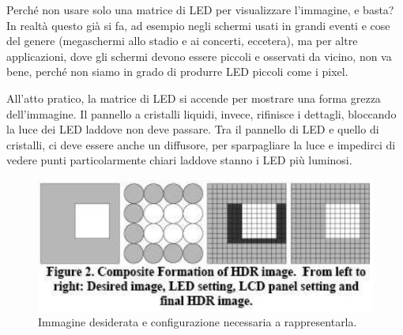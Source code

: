 \documentclass[a4paper,11pt]{article}
\begin{document}
Perché non usare solo una matrice di LED per visualizzare l'immagine, e basta? In realtà questo già si fa, ad esempio negli schermi usati in grandi eventi e cose del genere
(megaschermi allo stadio e ai concerti, eccetera), ma per altre applicazioni, dove gli schermi devono essere piccoli e osservati da vicino, non va bene,
perché non siamo in grado di produrre LED piccoli come i pixel.
\par
All'atto pratico, la matrice di LED si accende per mostrare una forma grezza dell'immagine. Il pannello a cristalli liquidi, invece, rifinisce i dettagli, bloccando
la luce dei LED laddove non deve passare. Tra il pannello di LED e quello di cristalli, ci deve essere anche un diffusore, per sparpagliare la luce
e impedirci di vedere punti particolarmente chiari laddove stanno i LED più luminosi.

\renewcommand{\thefigure}{4.13}
\begin{figure}[!h]
  \centering
    \includegraphics[scale=0.4]{images/4/led_lc_outline.png}
    \caption{Immagine desiderata e configurazione necessaria a rappresentarla.}
\end{figure}
\end{document}
